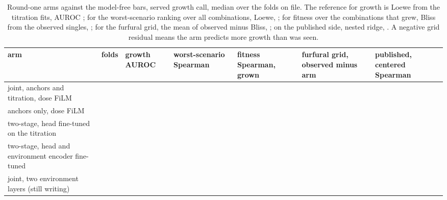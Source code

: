 \begin{table}[htbp]
  \centering
  \footnotesize
  \caption[]{Round-one arms against the model-free bars, served growth call, median
  over the folds on file. The reference for growth is Loewe from the titration fits,
  AUROC \hydloeweAuroc{}; for the worst-scenario ranking over all combinations, Loewe,
  \hydordersloeweworst{}; for fitness over the combinations that grew, Bliss from the
  observed singles, \hydblissSpearman{}; for the furfural grid, the mean of observed
  minus Bliss, \hydisoboleExTwoSixExcess{}; on the published side, nested ridge,
  \hydladderRidge{}. A negative grid residual means the arm predicts more growth than
  was seen.}
  \label{tab:arms}
  \begin{tabular}{@{}p{46mm}p{8mm}p{18mm}p{22mm}p{22mm}p{22mm}p{22mm}@{}}
    \toprule
    arm & folds & growth AUROC & worst-scenario Spearman & fitness Spearman, grown &
    furfural grid, observed minus arm & published, centered Spearman \\
    \midrule
    joint, anchors and titration, dose FiLM & \hydarmjointFilmfolds{} &
      \hydarmjointFilmauroc{} & \hydarmjointFilmworst{} & \hydarmjointFilmfitGrown{} &
      \hydarmjointFilmisoTwoSix{} & \hydarmjointFilmvan{} \\
    anchors only, dose FiLM & \hydarmanchorsFilmfolds{} &
      \hydarmanchorsFilmauroc{} & \hydarmanchorsFilmworst{} &
      \hydarmanchorsFilmfitGrown{} & \hydarmanchorsFilmisoTwoSix{} &
      \hydarmanchorsFilmvan{} \\
    two-stage, head fine-tuned on the titration & \hydarmftHeadfolds{} &
      \hydarmftHeadauroc{} & \hydarmftHeadworst{} & \hydarmftHeadfitGrown{} &
      \hydarmftHeadisoTwoSix{} & \hydarmftHeadvan{} \\
    two-stage, head and environment encoder fine-tuned & \hydarmftEnvfolds{} &
      \hydarmftEnvauroc{} & \hydarmftEnvworst{} & \hydarmftEnvfitGrown{} &
      \hydarmftEnvisoTwoSix{} & \hydarmftEnvvan{} \\
    joint, two environment layers (still writing) & \hydarmjointTwoLayerfolds{} &
      \hydarmjointTwoLayerauroc{} & \hydarmjointTwoLayerworst{} &
      \hydarmjointTwoLayerfitGrown{} & \hydarmjointTwoLayerisoTwoSix{} &
      \hydarmjointTwoLayervan{} \\
    \bottomrule
  \end{tabular}
\end{table}

